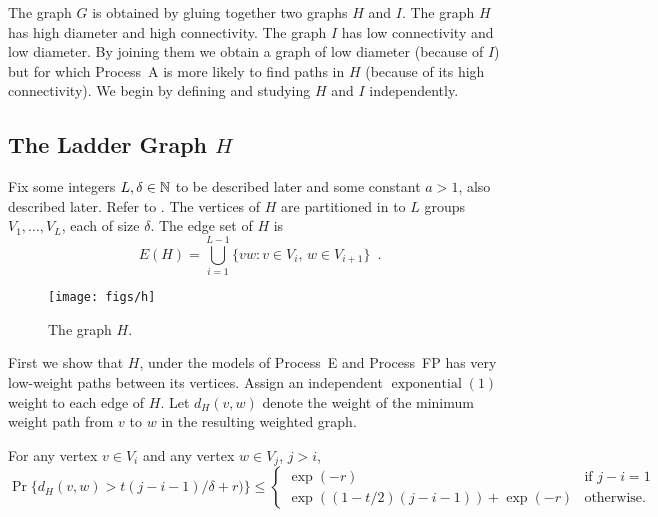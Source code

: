 \documentclass[lotsofwhite]{patmorin}
\DeclareMathOperator{\exponential}{exponential}
\begin{document}
The graph $G$ is obtained by gluing together two graphs $H$ and $I$.
The graph $H$ has high diameter and high connectivity.  The graph $I$
has low connectivity and low diameter.  By joining them we obtain a graph
of low diameter (because of $I$) but for which Process~A is more likely
to find paths in $H$ (because of its high connectivity).  We begin by
defining and studying $H$ and $I$ independently.


\subsection{The Ladder Graph $H$}

Fix some integers $L,\delta\in\mathbb{N}$ to be described later and some
constant $a>1$, also described later.  Refer to
.  The vertices of $H$ are partitioned in to $L$ groups
$V_1,\ldots,V_L$, each of size $\delta$. The edge set of $H$ is
\[
   E(H) = \bigcup_{i=1}^{L-1} \{vw : v\in V_{i},\, w\in V_{i+1}\} \enspace .
\]
\begin{figure}
  \begin{center}
    \texttt{[image: figs/h]} 
  \end{center}
  \caption{The graph $H$.}
\end{figure}

First we show that $H$, under the models of Process~E and Process~FP
has very low-weight paths between its vertices.
Assign an independent $\exponential(1)$ weight to each edge of $H$.
Let $d_H(v,w)$ denote the weight of the minimum weight path from $v$
to $w$ in the resulting weighted graph.

\begin{lem}
   For any vertex $v\in V_i$ and any vertex $w\in V_j$, $j>i$,
   \[
       \Pr\{d_H(v,w) > t(j-i-1)/\delta + r) \} \le
       \begin{cases}
           \exp(-r) & \text{if $j-i=1$} \\
           \exp((1-t/2)(j-i-1)) + \exp(-r) & \text{otherwise.}
       \end{cases}
   \]
\end{lem}
\end{document}
